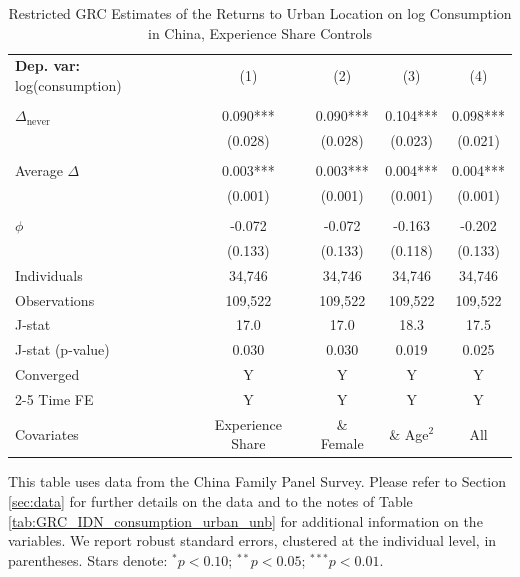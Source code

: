 \begin{table}[htbp] \centering \begin{threeparttable}
 \caption{Restricted GRC Estimates of the Returns to Urban Location on log Consumption in China, Experience Share Controls} 
 \label{tab:GRC_CHN_consumption_urban_unb_exp_sh} 
\begin{tabular}{l cccc} \toprule  \textbf{Dep. var:}  log(consumption) 
                    &\multicolumn{1}{c}{(1)}   &\multicolumn{1}{c}{(2)}   &\multicolumn{1}{c}{(3)}   &\multicolumn{1}{c}{(4)}   \\
                    &               &               &               &               \\
\addlinespace
$\Delta_{\text{never}}$&       0.090***&       0.090***&       0.104***&       0.098***\\
                    &     (0.028)   &     (0.028)   &     (0.023)   &     (0.021)   \\
                    &               &               &               &               \\
\addlinespace
Average $\Delta$    &       0.003***&       0.003***&       0.004***&       0.004***\\
                    &     (0.001)   &     (0.001)   &     (0.001)   &     (0.001)   \\
                    &               &               &               &               \\
\addlinespace
$\phi$              &      -0.072   &      -0.072   &      -0.163   &      -0.202   \\
                    &     (0.133)   &     (0.133)   &     (0.118)   &     (0.133)   \\
\addlinespace
Individuals         &      34,746   &      34,746   &      34,746   &      34,746   \\
Observations        &     109,522   &     109,522   &     109,522   &     109,522   \\
J-stat              &        17.0   &        17.0   &        18.3   &        17.5   \\
J-stat (p-value)    &       0.030   &       0.030   &       0.019   &       0.025   \\
Converged           &           Y   &           Y   &           Y   &           Y   \\
\cmidrule{2-5} Time FE & Y & Y & Y & Y \\ Covariates & Experience Share & \& Female & \& Age$^2$ & All \\ \bottomrule \end{tabular} \begin{tablenotes}[flushleft] \footnotesize \item{This table uses data from the China Family Panel Survey. Please refer to Section \ref{sec:data} for further details on the data and to the notes of Table \ref{tab:GRC_IDN_consumption_urban_unb} for additional information on the variables. We report robust standard errors, clustered at the individual level, in parentheses. Stars denote: $^{*} p<0.10$; $^{**} p<0.05$; $^{***} p<0.01$.} \end{tablenotes} \end{threeparttable} \end{table}
